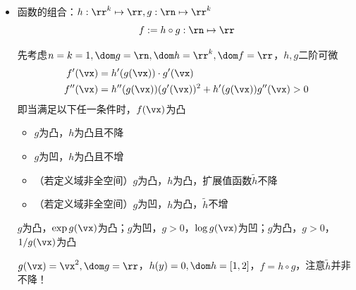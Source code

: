 \begin{itemize}
	\item 函数的组合：$h:\rr^k\mapsto\rr,g:\rn\mapsto\rr^k$
	\[f:=h\circ g:\rn\mapsto\rr\]
	\begin{analysis}
	先考虑$n=k=1,\dom g=\rn,\dom h=\rr^k,\dom f=\rr$，$h,g$二阶可微
	\[\begin{aligned}
	f'(\vx)&=h'(g(\vx))\cdot g'(\vx)\\
	f''(\vx)&=h''(g(\vx))(g'(\vx))^2+h'(g(\vx))g''(\vx)>0
	\end{aligned}\]
	即当满足以下任一条件时，$f(\vx)$为凸
	\begin{itemize}
		\item $g$为凸，$h$为凸且不降
		\item $g$为凹，$h$为凸且不增
		\item （若定义域非全空间）$g$为凸，$h$为凸，扩展值函数$\tilde{h}$不降
		\item （若定义域非全空间）$g$为凹，$h$为凸，$\tilde{h}$不增
	\end{itemize}
	\end{analysis}
	\begin{example}
	$g$为凸，$\exp g(\vx)$为凸；$g$为凹，$g>0$，$\log g(\vx)$为凹；$g$为凸，$g>0$，$1/g(\vx)$为凸
	\end{example}
	\begin{example}
	$g(\vx)=\vx^2,\dom g=\rr$，$h(y)=0,\dom h=[1,2]$，$f=h\circ g$，注意$\tilde{h}$并非不降！
	\end{example}


\end{itemize}
